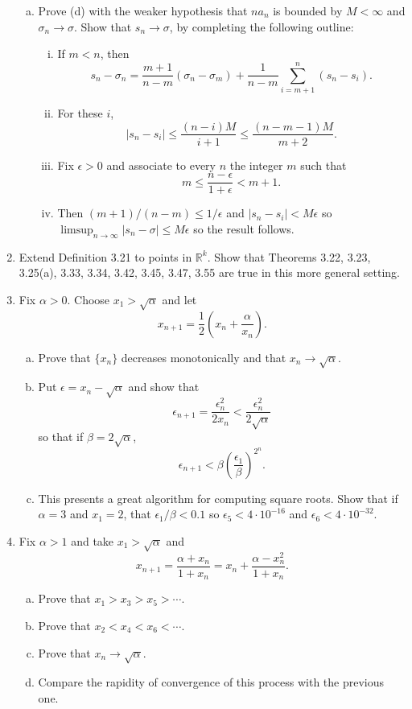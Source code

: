 \documentclass{scrbook}
\newcommand{\R}{\mathbb{R}}
\renewcommand{\to}{\rightarrow}
\begin{document}
\begin{enumerate}
\begin{enumerate}[(a)]
\item Prove (d) with the weaker hypothesis that $na_n$ is bounded by $M < \infty$ and $\sigma_n \to \sigma$. Show that $s_n \to \sigma$, by completing the following outline:
\begin{enumerate}[(i)]
\item If $m < n$, then
\[
	s_n - \sigma_n = \frac{m+1}{n-m}(\sigma_n - \sigma_m) + \frac{1}{n-m}\sum_{i=m+1}^{n} (s_n - s_i).
\]
\item For these $i$, 
\[
	|s_n - s_i| \le \frac{(n-i)M}{i+1} \le \frac{(n-m-1)M}{m+2}.
\]
\item Fix $\epsilon > 0$ and associate to every $n$ the integer $m$ such that
\[
	m \le \frac{n - \epsilon}{1 + \epsilon} < m + 1.
\]
\item Then $(m+1)/(n-m) \le 1/\epsilon$ and $|s_n - s_i| < M\epsilon$ so $\limsup_{n \to \infty} |s_n - \sigma| \le M\epsilon$ so the result follows.
\end{enumerate}
\end{enumerate}

\item %
Extend Definition 3.21 to points in $\R^k$. Show that Theorems 3.22, 3.23, 3.25(a), 3.33, 3.34, 3.42, 3.45, 3.47, 3.55 are true in this more general setting.

\item %
Fix $\alpha > 0$. Choose $x_1 > \sqrt{\alpha}$ and let
\[
	x_{n+1} = \frac{1}{2} \left(x_n + \frac{\alpha}{x_n}\right).
\]
\begin{enumerate}[(a)]
\item Prove that $\{x_n\}$ decreases monotonically and that $x_n \to \sqrt{\alpha}$.

\item Put $\epsilon = x_n - \sqrt{\alpha}$ and show that
\[
	\epsilon_{n+1} = \frac{\epsilon_n^2}{2x_n} < \frac{\epsilon_n^2}{2\sqrt{\alpha}}
\]
so that if $\beta = 2\sqrt{\alpha}$,
\[
	\epsilon_{n+1} < \beta\left(\frac{\epsilon_1}{\beta}\right)^{2^n}.
\]
\item This presents a great algorithm for computing square roots. Show that if $\alpha = 3$ and $x_1 = 2$, that $\epsilon_1/\beta < 0.1$ so $\epsilon_5 < 4 \cdot 10^{-16}$ and $\epsilon_6 < 4 \cdot 10^{-32}$.
\end{enumerate}

\item %
Fix $\alpha > 1$ and take $x_1 > \sqrt{\alpha}$ and
\[
	x_{n+1} = \frac{\alpha + x_n}{1 + x_n} = x_n + \frac{\alpha - x_n^2}{1 + x_n}.
\]
\begin{enumerate}[(a)]
\item Prove that $x_1 > x_3 > x_5 > \dotsb$.
\item Prove that $x_2 < x_4 < x_6 < \dotsb$.
\item Prove that $x_n \to \sqrt{\alpha}$.
\item Compare the rapidity of convergence of this process with the previous one.
\end{enumerate}


\end{enumerate}
\end{document}
